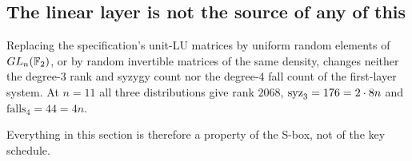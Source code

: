 \subsection{The linear layer is not the source of any of this}

\begin{observation}\label{obs:distribution}
 Replacing the specification's unit-LU matrices by uniform random
elements of $GL_n(\mathbb{F}_2)$, or by random invertible matrices of the same density, changes neither the
degree-3 rank and syzygy count nor the degree-4 fall count of the first-layer system. At $n=11$ all
three distributions give rank $2068$, $\operatorname{syz}_3=176=2\cdot 8n$ and $\mathrm{falls}_4=44=4n$.
\end{observation}

Everything in this section is therefore a property of the S-box, not of the key schedule.
